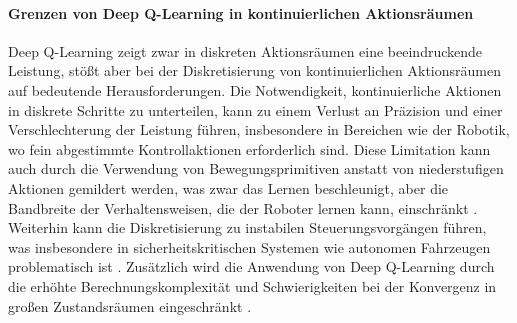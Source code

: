 \paragraph{Grenzen von Deep Q-Learning in kontinuierlichen Aktionsräumen}
Deep Q-Learning zeigt zwar in diskreten Aktionsräumen eine beeindruckende Leistung, stößt aber bei der Diskretisierung von kontinuierlichen Aktionsräumen auf bedeutende Herausforderungen. Die Notwendigkeit, kontinuierliche Aktionen in diskrete Schritte zu unterteilen, kann zu einem Verlust an Präzision und einer Verschlechterung der Leistung führen, insbesondere in Bereichen wie der Robotik, wo fein abgestimmte Kontrollaktionen erforderlich sind. Diese Limitation kann auch durch die Verwendung von Bewegungsprimitiven anstatt von niederstufigen Aktionen gemildert werden, was zwar das Lernen beschleunigt, aber die Bandbreite der Verhaltensweisen, die der Roboter lernen kann, einschränkt \cite{russell2021ai}. Weiterhin kann die Diskretisierung zu instabilen Steuerungsvorgängen führen, was insbesondere in sicherheitskritischen Systemen wie autonomen Fahrzeugen problematisch ist \cite{Wu2018AggregatedMultiDDPG}. Zusätzlich wird die Anwendung von Deep Q-Learning durch die erhöhte Berechnungskomplexität und Schwierigkeiten bei der Konvergenz in großen Zustandsräumen eingeschränkt \cite{russell2021ai}.



